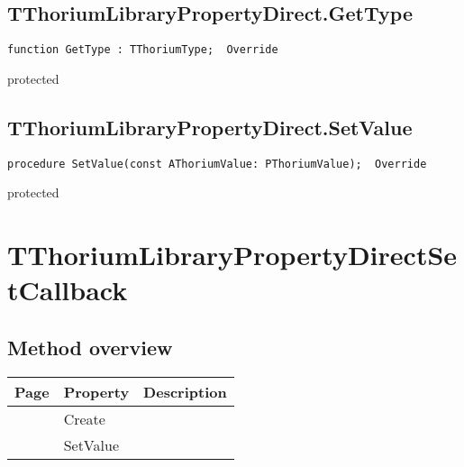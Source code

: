 \subsection{TThoriumLibraryPropertyDirect.GetType}
\label{thoriumcore:thorium:tthoriumlibrarypropertydirect:gettype}
\begin{FPCList}
\Synopsis
\Declaration 

\begin{verbatim}
function GetType : TThoriumType;  Override
\end{verbatim}
\Visibility
protected
\Description
\Errors
\end{FPCList}
\subsection{TThoriumLibraryPropertyDirect.SetValue}
\label{thoriumcore:thorium:tthoriumlibrarypropertydirect:setvalue}
\begin{FPCList}
\Synopsis
\Declaration 

\begin{verbatim}
procedure SetValue(const AThoriumValue: PThoriumValue);  Override
\end{verbatim}
\Visibility
protected
\Description
\Errors
\end{FPCList}
\section{TThoriumLibraryPropertyDirectSetCallback}
\label{thoriumcore:thorium:tthoriumlibrarypropertydirectsetcallback}
\subsection{Method overview}
\label{thoriumcore:thorium:tthoriumlibrarypropertydirectsetcallback:methods}
\begin{tabularx}{\textwidth}{llX}
Page & Property & Description  \\ \hline
\pageref{thoriumcore:thorium:tthoriumlibrarypropertydirectsetcallback:create} & Create  &  \\
\pageref{thoriumcore:thorium:tthoriumlibrarypropertydirectsetcallback:setvalue} & SetValue  &  \\
\hline
\end{tabularx}
